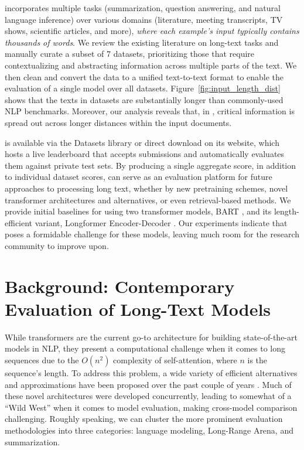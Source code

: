 \scrolls{} incorporates multiple tasks (summarization, question answering, and natural language inference) over various domains (literature, meeting transcripts, TV shows, scientific articles, and more),
\textit{where each example's input typically contains thousands of words}. We review the existing literature on long-text tasks and manually curate a subset of 7 datasets, prioritizing those that require contextualizing and abstracting information across multiple parts of the text. We then clean and convert the data to a unified text-to-text format to enable the evaluation of a single model over all datasets.
Figure~\ref{fig:input_length_dist} shows that the texts in \scrolls{} datasets are substantially longer than commonly-used NLP benchmarks. Moreover, our analysis reveals that, in \scrolls{}, critical information is spread out across longer distances within the input documents.

\scrolls{} is available via the Datasets library \cite{lhoest-etal-2021-datasets} or direct download on its website, which hosts a live leaderboard that accepts submissions and automatically evaluates them against private test sets. By producing a single aggregate score, in addition to individual dataset scores, \scrolls{} can serve as an evaluation platform for future approaches to processing long text, whether by new pretraining schemes, novel transformer architectures and alternatives, or even retrieval-based methods. We provide initial baselines for \scrolls{} using two transformer models, BART \cite{lewis-etal-2020-bart}, and its length-efficient variant, Longformer Encoder-Decoder \cite{beltagy2020longformer}. Our experiments indicate that \scrolls{} poses a formidable challenge for these models, leaving much room for the research community to improve upon.

\section{Background: Contemporary Evaluation of Long-Text Models}
\label{sec:RelatedWork}

While transformers \cite{NIPS2017_3f5ee243} are the current go-to architecture for building state-of-the-art models in NLP, they present a computational challenge when it comes to long sequences due to the $O(n^2)$ complexity of self-attention, where $n$ is the sequence's length. To address this problem, a wide variety of efficient alternatives and approximations have been proposed over the past couple of years \cite{tay2020efficient, fournier2021practical}. Much of these novel architectures were developed concurrently, leading to somewhat of a ``Wild West'' when it comes to model evaluation, making cross-model comparison challenging. Roughly speaking, we can cluster the more prominent evaluation methodologies into three categories: language modeling, Long-Range Arena, and summarization.

